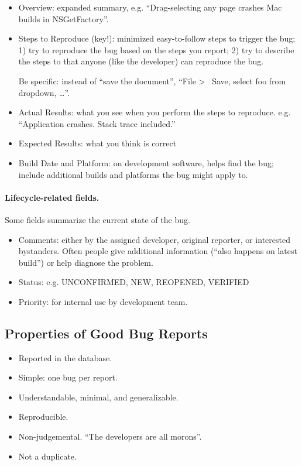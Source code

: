 \documentclass[11pt]{article}
\begin{document}
\begin{itemize}[noitemsep]
\item Overview: expanded summary, e.g. ``Drag-selecting any page crashes 
Mac builds in NSGetFactory''.
\item Steps to Reproduce (key!): minimized easy-to-follow steps to trigger
the bug; 1) try to reproduce the bug based on the steps you report; 2)
try to describe the steps to that anyone (like the developer) can reproduce
the bug. 

Be specific: instead of ``save the document'', 
``File \textgreater~ Save, select foo from dropdown, \ldots''.
\item Actual Results: what you see when you perform the steps to reproduce.
e.g. ``Application crashes. Stack trace included.''
\item Expected Results: what you think is correct
\item Build Date and Platform: on development software, helps find the bug;
include additional builds and platforms the bug might apply to.
\end{itemize}

\paragraph{Lifecycle-related fields.} Some fields summarize the
current state of the bug.
\begin{itemize}[noitemsep]
\item Comments: either by the assigned developer, original reporter, or
interested bystanders. Often people give additional information (``also happens
on latest build'') or help diagnose the problem.
\item Status: e.g. UNCONFIRMED, NEW, REOPENED, VERIFIED
\item Priority: for internal use by development team.
\end{itemize}

\subsection*{Properties of Good Bug Reports}
\begin{itemize}[noitemsep]
\item Reported in the database.
\item Simple: one bug per report.
\item Understandable, minimal, and generalizable.
\item Reproducible.
\item Non-judgemental. ``The developers are all morons''.
\item Not a duplicate.
\end{itemize}
\end{document}

